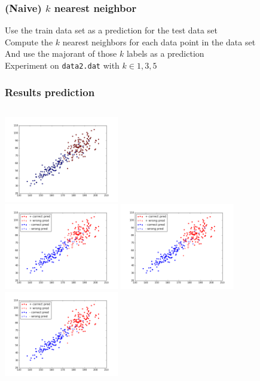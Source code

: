 \documentclass{beamer}
\begin{document}
\begin{frame}
	\frametitle{(Naive) $k$ nearest neighbor}
	Use the train data set as a prediction for the test data set \\\medskip
	Compute the $k$ nearest neighbors for each data point in the data set \\\medskip
	And use the majorant of those $k$ labels as a prediction \\\medskip
	Experiment on \texttt{data2.dat} with $k \in {1,3,5}$
\end{frame}

\begin{frame}
\frametitle{Results prediction}
	\begin{columns}[t]
	\centering
	\includegraphics[width=5cm]{graphics/testWithCorrect}\\
	\includegraphics[width=5cm]{graphics/1NNPrediction}
	\centering
	\includegraphics[width=5cm]{graphics/3NNPrediction}\\
	\includegraphics[width=5cm]{graphics/5NNPrediction}
\end{columns}
\end{frame}
\end{document}
